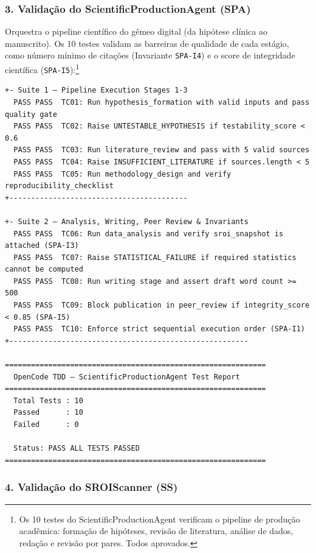 \subsubsection*{3. Validação do ScientificProductionAgent (SPA)}

Orquestra o pipeline científico do gêmeo digital (da hipótese clínica ao manuscrito). Os 10 testes validam as barreiras de qualidade de cada estágio, como número mínimo de citações (Invariante \texttt{SPA-I4}) e o score de integridade científica (\texttt{SPA-I5}):\footnote{Os 10 testes do ScientificProductionAgent verificam o pipeline de produção acadêmica: formação de hipóteses, revisão de literatura, análise de dados, redação e revisão por pares. Todos aprovados.}

\begin{lstlisting}[style=bashstyle, caption={Saída do Executor de Testes do OpenCode ScientificProductionAgent}, label={lst:tdd_spa_output}]
+- Suite 1 — Pipeline Execution Stages 1-3
  PASS PASS  TC01: Run hypothesis_formation with valid inputs and pass quality gate
  PASS PASS  TC02: Raise UNTESTABLE_HYPOTHESIS if testability_score < 0.6
  PASS PASS  TC03: Run literature_review and pass with 5 valid sources
  PASS PASS  TC04: Raise INSUFFICIENT_LITERATURE if sources.length < 5
  PASS PASS  TC05: Run methodology_design and verify reproducibility_checklist
+-----------------------------------------

+- Suite 2 — Analysis, Writing, Peer Review & Invariants
  PASS PASS  TC06: Run data_analysis and verify sroi_snapshot is attached (SPA-I3)
  PASS PASS  TC07: Raise STATISTICAL_FAILURE if required statistics cannot be computed
  PASS PASS  TC08: Run writing stage and assert draft word count >= 500
  PASS PASS  TC09: Block publication in peer_review if integrity_score < 0.85 (SPA-I5)
  PASS PASS  TC10: Enforce strict sequential execution order (SPA-I1)
+-------------------------------------------------------

============================================================
  OpenCode TDD — ScientificProductionAgent Test Report
============================================================
  Total Tests : 10
  Passed      : 10
  Failed      : 0

  Status: PASS ALL TESTS PASSED
============================================================
\end{lstlisting}

\subsubsection*{4. Validação do SROIScanner (SS)}

